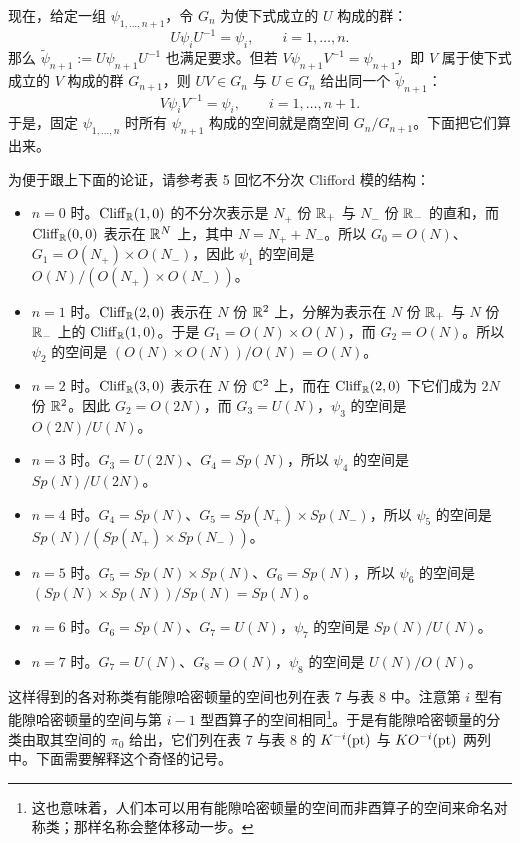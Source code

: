 现在，给定一组 $\psi_{1,\ldots,n+1}$，令 $G_n$ 为使下式成立的 $U$ 构成的群：
\begin{equation}
U\psi_iU^{-1}=\psi_i,\qquad i=1,\ldots,n. \tag{11.39}
\end{equation}
那么 $\tilde\psi_{n+1}:=U\psi_{n+1}U^{-1}$ 也满足要求。但若 $V\psi_{n+1}V^{-1}=\psi_{n+1}$，即 $V$ 属于使下式成立的 $V$ 构成的群 $G_{n+1}$，则 $UV\in G_n$ 与 $U\in G_n$ 给出同一个 $\tilde\psi_{n+1}$：
\begin{equation}
V\psi_iV^{-1}=\psi_i,\qquad i=1,\ldots,n+1. \tag{11.40}
\end{equation}
于是，固定 $\psi_{1,\ldots,n}$ 时所有 $\psi_{n+1}$ 构成的空间就是商空间 $G_n/G_{n+1}$。下面把它们算出来。

为便于跟上下面的论证，请参考表 5 回忆不分次 Clifford 模的结构：
\begin{itemize}
  \item $n=0$ 时。$\mathrm{Cliff}_{\mathbb{R}}(1,0)$ 的不分次表示是 $N_+$ 份 $\mathbb{R}_+$ 与 $N_-$ 份 $\mathbb{R}_-$ 的直和，而 $\mathrm{Cliff}_{\mathbb{R}}(0,0)$ 表示在 $\mathbb{R}^N$ 上，其中 $N=N_++N_-$。所以 $G_0=O(N)$、$G_1=O(N_+)\times O(N_-)$，因此 $\psi_1$ 的空间是 $O(N)/(O(N_+)\times O(N_-))$。
  \item $n=1$ 时。$\mathrm{Cliff}_{\mathbb{R}}(2,0)$ 表示在 $N$ 份 $\mathbb{R}^2$ 上，分解为表示在 $N$ 份 $\mathbb{R}_+$ 与 $N$ 份 $\mathbb{R}_-$ 上的 $\mathrm{Cliff}_{\mathbb{R}}(1,0)$。于是 $G_1=O(N)\times O(N)$，而 $G_2=O(N)$。所以 $\psi_2$ 的空间是 $(O(N)\times O(N))/O(N)=O(N)$。
  \item $n=2$ 时。$\mathrm{Cliff}_{\mathbb{R}}(3,0)$ 表示在 $N$ 份 $\mathbb{C}^2$ 上，而在 $\mathrm{Cliff}_{\mathbb{R}}(2,0)$ 下它们成为 $2N$ 份 $\mathbb{R}^2$。因此 $G_2=O(2N)$，而 $G_3=U(N)$，$\psi_3$ 的空间是 $O(2N)/U(N)$。
  \item $n=3$ 时。$G_3=U(2N)$、$G_4=Sp(N)$，所以 $\psi_4$ 的空间是 $Sp(N)/U(2N)$。
  \item $n=4$ 时。$G_4=Sp(N)$、$G_5=Sp(N_+)\times Sp(N_-)$，所以 $\psi_5$ 的空间是 $Sp(N)/(Sp(N_+)\times Sp(N_-))$。
  \item $n=5$ 时。$G_5=Sp(N)\times Sp(N)$、$G_6=Sp(N)$，所以 $\psi_6$ 的空间是 $(Sp(N)\times Sp(N))/Sp(N)=Sp(N)$。
  \item $n=6$ 时。$G_6=Sp(N)$、$G_7=U(N)$，$\psi_7$ 的空间是 $Sp(N)/U(N)$。
  \item $n=7$ 时。$G_7=U(N)$、$G_8=O(N)$，$\psi_8$ 的空间是 $U(N)/O(N)$。
\end{itemize}

这样得到的各对称类有能隙哈密顿量的空间也列在表 7 与表 8 中。注意第 $i$ 型有能隙哈密顿量的空间与第 $i-1$ 型酉算子的空间相同\footnote[18]{这也意味着，人们本可以用有能隙哈密顿量的空间而非酉算子的空间来命名对称类；那样名称会整体移动一步。}。于是有能隙哈密顿量的分类由取其空间的 $\pi_0$ 给出，它们列在表 7 与表 8 的 $K^{-i}(\mathrm{pt})$ 与 $KO^{-i}(\mathrm{pt})$ 两列中。下面需要解释这个奇怪的记号。

